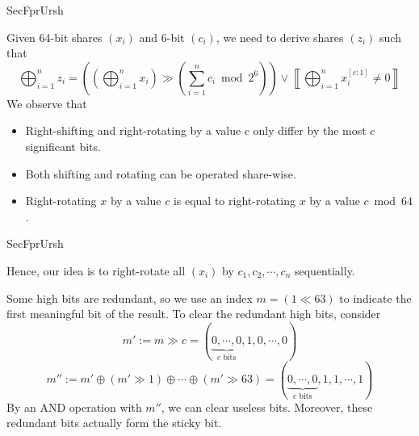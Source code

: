 \begin{frame}{SecFprUrsh}

Given 64-bit shares $(x_i)$ and 6-bit $(c_i)$, we need to derive shares $(z_i)$ such that
\[
\bigoplus_{i=1}^n z_i = \left( \left( \bigoplus_{i=1}^n x_i \right) \gg \left( \sum_{i=1}^n c_i \bmod 2^{6} \right) \right) \vee \left \llbracket \bigoplus_{i=1}^n x_i^{[c:1]} \neq 0 \right \rrbracket
\]
\pause
We observe that
\pause
\begin{itemize}

\item Right-shifting and right-rotating by a value $c$ only differ by the most $c$ significant bits.
\pause
\item Both shifting and rotating can be operated share-wise.
\pause
\item Right-rotating $x$ by a value $c$ is equal to right-rotating $x$ by a value $c \bmod 64$.
\end{itemize}

\end{frame}


\begin{frame}{SecFprUrsh}

Hence, our idea is to right-rotate all $(x_i)$ by $c_1, c_2, \cdots, c_n$ sequentially.
\pause
\medskip

Some high bits are redundant, so we use an index $m = (1 \ll 63)$ to indicate the first meaningful bit of the result.
\pause
To clear the redundant high bits, consider
\[
m' := m \gg c = (\underbrace{0, \cdots, 0}_{c \text{ bits}}, 1, 0, \cdots, 0)
\]
\pause
\[
m'' := m' \oplus (m' \gg 1) \oplus \cdots \oplus (m' \gg 63) = (\underbrace{0, \cdots, 0}_{c \text{ bits}}, 1, 1, \cdots, 1)
\]
\pause
By an AND operation with $m''$, we can clear useless bits. Moreover, these redundant bits actually form the sticky bit.

\end{frame}


